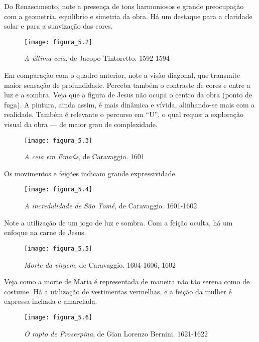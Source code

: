 Do Renascimento, note a presença de tons harmoniosos e grande preocupação com a geometria, equilíbrio e simetria da obra. Há um destaque para a claridade solar e para a suavização das cores.

\newpage

\begin{figure}[h]
\texttt{[image: figura\_5.2]}
\caption{\textit{A última ceia}, de Jacopo Tintoretto. 1592-1594}
\label{fig:mesh5.2}
\end{figure}

Em comparação com o quadro anterior, note a visão diagonal, que transmite maior sensação de profundidade. Perceba também o contraste de cores e entre a luz e a sombra. Veja que a figura de Jesus não ocupa o centro da obra (ponto de fuga). A pintura, ainda assim, é mais dinâmica e vívida, alinhando-se mais com a realidade. Também é relevante o percurso em ``U'', o qual requer a exploração visual da obra — de maior grau de complexidade.

\newpage

\begin{figure}[h]
\texttt{[image: figura\_5.3]}
\caption{\textit{A ceia em Emaús}, de Caravaggio. 1601}
\label{fig:mesh5.3}
\end{figure}

Os movimentos e feições indicam grande expressividade.

\newpage

\begin{figure}[h]
\texttt{[image: figura\_5.4]}
\caption{\textit{A incredulidade de São Tomé}, de Caravaggio. 1601-1602}
\label{fig:mesh5.4}
\end{figure}

Note a utilização de um jogo de luz e sombra. Com a feição oculta, há um enfoque na carne de Jesus.

\newpage

\begin{figure}[h]
\texttt{[image: figura\_5.5]}
\caption{\textit{Morte da virgem}, de Caravaggio. 1604-1606, 1602}
\label{fig:mesh5.5}
\end{figure}

Veja como a morte de Maria é representada de maneira não tão serena como de costume. Há a utilização de vestimentas vermelhas, e a feição da mulher é expressa inchada e amarelada.

\newpage

\begin{figure}[h]
\texttt{[image: figura\_5.6]}
\caption{\textit{O rapto de Proserpina}, de Gian Lorenzo Bernini. 1621-1622}
\label{fig:mesh5.6}
\end{figure}

